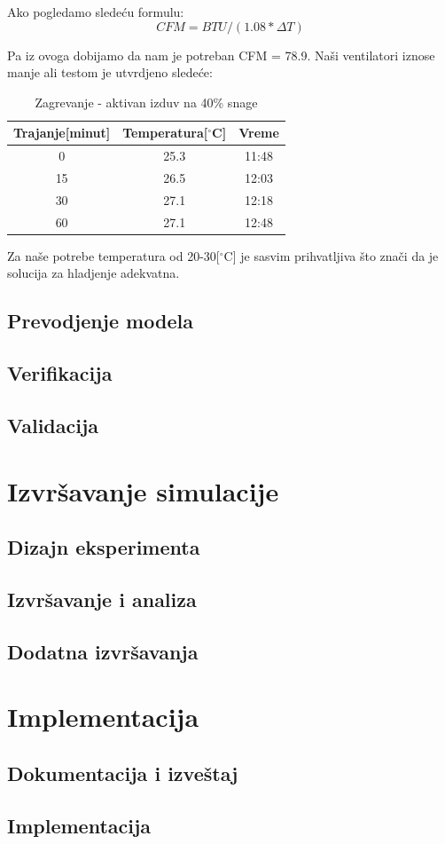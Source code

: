 \documentclass[a4paper,11pt]{book}
\begin{document}
Ako pogledamo sledeću formulu: 
\[ CFM = BTU / (1.08 * \Delta T)\]

Pa iz ovoga dobijamo da nam je potreban CFM = 78.9. Naši ventilatori iznose manje ali testom je utvrdjeno sledeće:

\begin{table}[ht]
  \caption{Zagrevanje - aktivan izduv na 40\% snage}
  \centering
  \begin{tabular}{|c|c|c|}
  \hline
    Trajanje[minut] & Temperatura[$^\circ$C] & Vreme\\ \hline
  0 & 25.3 & 11:48 \\ \hline
  15 & 26.5 & 12:03 \\ \hline
  30 & 27.1 & 12:18 \\ \hline
  60 & 27.1 & 12:48 \\ \hline
  \end{tabular}
\end{table}

Za naše potrebe temperatura od 20-30[$^\circ$C] je sasvim prihvatljiva što znači da je solucija za hladjenje adekvatna.


\section{Prevodjenje modela}

\section{Verifikacija}

\section{Validacija}

\chapter{Izvršavanje simulacije}

\section{Dizajn eksperimenta}

\section{Izvršavanje i analiza}

\section{Dodatna izvršavanja}

\chapter{Implementacija}

\section{Dokumentacija i izveštaj}

\section{Implementacija}
\end{document}
